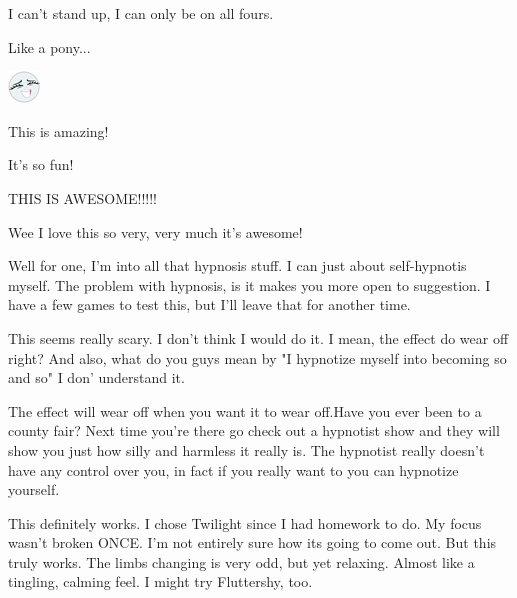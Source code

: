 \documentclass[ebook,12pt,oneside,openany]{memoir}
\begin{document}
\begin{tcolorbox}[title=Nixter]
\par{I can't stand up, I can only be on all fours.}
\newline{}
\par{Like a pony...}
\newline{}
\par{\includegraphics{images/mlp_8pfRZzv.png}}
\newline{}
\newline{}
\par{This is amazing!}
\par{It's so fun!}
\newline{}
\par{THIS IS AWESOME!!!!!}
\newline{}
\newline{}
\par{Wee I love this so very, very much it's awesome!}
\end{tcolorbox}
\begin{tcolorbox}[title=Faceless]
\par{Well for one, I'm into all that hypnosis stuff. I can just about self-hypnotis myself. The problem with hypnosis, is it makes you more open to suggestion. I have a few games to test this, but I'll leave that for another time.}
\end{tcolorbox}
\begin{tcolorbox}[title=Lord Bababa,colback=red!5!white,colframe=red!75!black,coltitle=white]
\begin{tcolorbox}[title=SkyWind]
\par{This seems really scary. I don't think I would do it. I mean, the effect do wear off right? And also, what do you guys mean by  "I hypnotize myself into becoming so and so" I don' understand it. }
\end{tcolorbox}
\par{The effect will wear off when you want it to wear off.Have you ever been to a county fair? Next time you're there go check out a hypnotist show and they will show you just how silly and harmless it really is. The hypnotist really doesn't have any control over you, in fact if you really want to you can hypnotize yourself.}
\end{tcolorbox}
\begin{tcolorbox}[title=Sketchi Inktip Quillwing]
\par{This definitely works. I chose Twilight since I had homework to do. My focus wasn't broken ONCE. I'm not entirely sure how its going to come out. But this truly works. The limbs changing is very odd, but yet relaxing. Almost like a tingling, calming feel. I might try Fluttershy, too.}
\end{tcolorbox}
\end{document}
